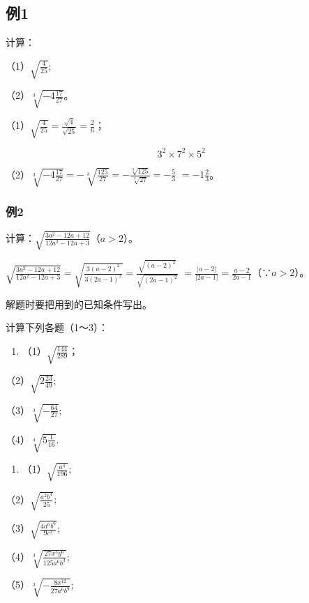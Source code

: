 \subsection{例1}

计算：

（1）\(\sqrt{\frac{4}{25}};\)

（2）\(\sqrt[3]{-4\frac{17}{27}}\)。

（1）\(\sqrt{\frac{4}{25}} = \frac{\sqrt{4}}{\sqrt{25}} = \frac{2}{6}\)；

\[
3 ^ {2} \times 7 ^ {2} \times 5 ^ {2}
\]

（2）\(\sqrt[3]{-4\frac{17}{27}} = -\sqrt[3]{\frac{125}{27}} = -\frac{\sqrt[3]{125}}{\sqrt[3]{27}} = -\frac{5}{3}\) \(= -1\frac{2}{3}\)。

\subsubsection{例2}

计算：\(\sqrt{\frac{3a^2 - 12a + 12}{12a^2 - 12a + 3}}\)（\(a > 2\)）。

\(\sqrt{\frac{3a^2 - 12a + 12}{12a^2 - 12a + 3}} = \sqrt{\frac{3(a - 2)^2}{3(2a - 1)^2}} = \frac{\sqrt{(a - 2)^2}}{\sqrt{(2a - 1)^2}}\) \(= \frac{|a - 2|}{|2a - 1|} = \frac{a - 2}{2a - 1}\)（∵\(a > 2\)）。

 解题时要把用到的已知条件写出。

计算下列各题（1～3）：

\begin{enumerate}
\item
  （1）\(\sqrt{\frac{144}{289}}\)；
\end{enumerate}

（2）\(\sqrt{2\frac{23}{49}};\)

（3）\(\sqrt[3]{-\frac{64}{27}};\)

（4）\(\sqrt[4]{5\frac{1}{16}}.\)

\begin{enumerate}[start=2]
\item
  （1）\(\sqrt{\frac{a^4}{196}};\)
\end{enumerate}

（2）\(\sqrt{\frac{a^2b^4}{25}};\)

（3）\(\sqrt{\frac{4a^6b^6}{9c^2}};\)

（4）\(\sqrt[3]{\frac{27x^3y^6}{125a^6b^3}};\)

（5）\(\sqrt[3]{-\frac{8x^{12}}{27a^6b^9}};\)

